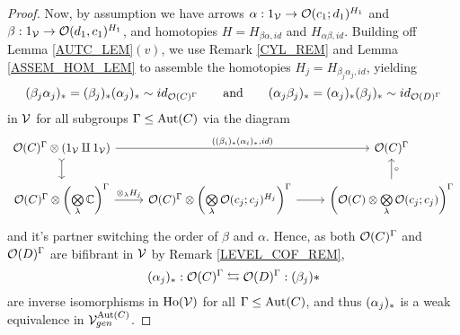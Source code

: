 \documentclass[a4paper,10pt
,draft
]{article}%
\renewcommand{\1}{\eta}%
\begin{document}
\begin{proof}
      Now, by assumption we have
      arrows $\alpha: 1_{\mathcal V} \to \mathcal{O}(c_1; d_1)^{H_1}$ and $\beta: 1_{\mathcal V} \to \mathcal{O}(d_1, c_1)^{H_1}$,
      and homotopies $H = H_{\beta\alpha,id}$ and $H_{\alpha\beta,id}$.
      Building off Lemma \ref{AUTC_LEM}$(v)$, we use Remark \ref{CYL_REM} and Lemma \ref{ASSEM_HOM_LEM} to assemble the homotopies $H_j = H_{\beta_j \alpha_j,id}$, yielding
      \begin{equation}
            (\beta_j \alpha_j)_{\**} = (\beta_j)_{\**} (\alpha_j)_{\**} \sim id_{\O(C)^\Gamma}
            \qquad
            \textrm{and}
            \qquad
            (\alpha_j \beta_j)_{\**} = (\alpha_j)_{\**} (\beta_j)_{\**} \sim id_{\O(D)^\Gamma}
      \end{equation}
      in $\mathcal V$ for all subgroups $\Gamma \leq \operatorname{Aut}(C)$ via the diagram
      \begin{equation}
            \begin{tikzcd}
                  \O(C)^\Gamma \otimes (1_\V \amalg 1_\V) \arrow[d, tail] \arrow[rr, "{((\beta_i)_{\**}(\alpha_i)_{\**}, id)}"]
                  &&
                  \O(C)^\Gamma
                  \\                  
                  \O(C)^\Gamma \otimes \left(\bigotimes\limits_\lambda \mathbb C\right)^{\Gamma}
                  \arrow[r, "\otimes_\lambda H_j"]
                  &
                  \O(C)^\Gamma \otimes \left(\bigotimes\limits_\lambda \O(c_j;c_j)^{H_j}\right)^{\Gamma} \arrow[r]
                  &
                  \left( \O(C) \otimes \bigotimes\limits_\lambda \O(c_j;c_j) \right)^{\Gamma} \arrow[u, "\circ"']
            \end{tikzcd}
      \end{equation}
      and it's partner switching the order of $\beta$ and $\alpha$.      
      Hence, as both $\mathcal{O}(C)^\Gamma$ and $\mathcal{O}(D)^\Gamma$ are bifibrant in $\mathcal V$ by Remark \ref{LEVEL_COF_REM},
      \[
            (\alpha_j)_{\**}: \O(C)^\Gamma \leftrightarrows \O(D)^\Gamma : (\beta_j){\**}
      \]
      are inverse isomorphisms in $\operatorname{Ho}(\mathcal V)$ for all $\Gamma \leq \operatorname{Aut}(C)$,
      and thus $(\alpha_j)_{\**}$ is a weak equivalence in $\mathcal V^{\operatorname{Aut}(C)}_{gen}$.


\end{proof}
\end{document}
